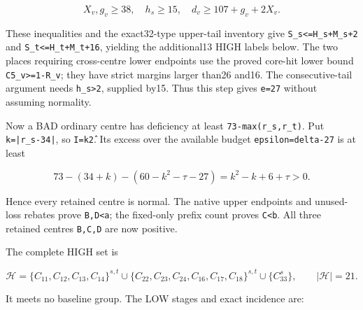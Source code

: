 \documentclass[10pt,a4paper]{article}
\theoremstyle{definition}
\begin{document}
\[
 X_v,\allowbreak{}g_v\ge38,\allowbreak{}\quad h_s\ge15,\allowbreak{}
 \quad d_v\ge107+\allowbreak{}g_v+\allowbreak{}2X_v.
\]

These inequalities and the exact32-type upper-tail inventory give
\texttt{S\_\allowbreak{}\allowbreak{}s<=\allowbreak{}H\_\allowbreak{}\allowbreak{}s+\allowbreak{}M\_\allowbreak{}\allowbreak{}s+\allowbreak{}2} and
\texttt{S\_\allowbreak{}\allowbreak{}t<=\allowbreak{}H\_\allowbreak{}\allowbreak{}t+\allowbreak{}M\_\allowbreak{}\allowbreak{}t+\allowbreak{}16},\allowbreak{} yielding the additional13
HIGH labels below. The two places requiring cross-centre lower endpoints
use the proved core-hit lower bound
\texttt{C5\_\allowbreak{}\allowbreak{}v>=\allowbreak{}1-R\_\allowbreak{}\allowbreak{}v}; they have strict margins larger
than26 and16. The consecutive-tail argument needs
\texttt{h\_\allowbreak{}\allowbreak{}s>2},\allowbreak{} supplied by15. Thus this step gives
\texttt{e=\allowbreak{}27} without assuming normality.

Now a BAD ordinary centre has deficiency at least
\texttt{73-max(r\_\allowbreak{}\allowbreak{}s,\allowbreak{}r\_\allowbreak{}\allowbreak{}t)}. Put
\texttt{k=\allowbreak{}|r\_\allowbreak{}\allowbreak{}s-34|},\allowbreak{} so
\texttt{I=\allowbreak{}k\^2}. Its excess over the available budget
\texttt{epsilon=\allowbreak{}delta-27} is at least

\[
 73-(34+\allowbreak{}k)-(60-k^2-\tau-27)
   =\allowbreak{}k^2-k+\allowbreak{}6+\allowbreak{}\tau>0.
\]

Hence every retained centre is normal. The native upper endpoints and
unused-loss rebates prove \texttt{B,\allowbreak{}D<a}; the
fixed-only prefix count proves \texttt{C<b}. All three
retained centres \texttt{B,\allowbreak{}C,\allowbreak{}D} are now positive.

The complete HIGH set is

\[
 \mathcal H=\allowbreak{}\{C_{11},\allowbreak{}C_{12},\allowbreak{}C_{13},\allowbreak{}C_{14}\}^{s,\allowbreak{}t}
 \cup\{C_{22},\allowbreak{}C_{23},\allowbreak{}C_{24},\allowbreak{}C_{16},\allowbreak{}C_{17},\allowbreak{}C_{18}\}^{s,\allowbreak{}t}
 \cup\{C_{33}^{s}\},\allowbreak{}\qquad|\mathcal H|=\allowbreak{}21.
\]

It meets no baseline group. The LOW stages and exact incidence are:
\end{document}
